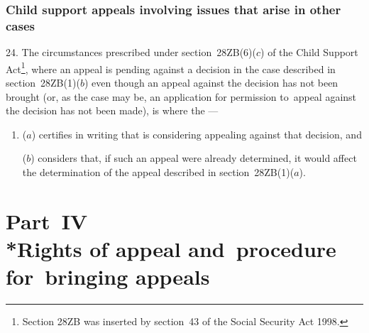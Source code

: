 \documentclass[12pt,a4paper]{article}
\begin{document}
\subsubsection[24. Child support appeals involving issues that arise in other cases]{Child support appeals involving issues that arise in other cases}

24.  The circumstances prescribed under section~28ZB(6)($c$) of the Child Support Act\footnote{\frenchspacing Section 28ZB was inserted by section~43 of the Social Security Act 1998.}, where an appeal is pending against a decision in the case described in section~28ZB(1)($b$) even though an appeal against the decision has not been brought (or, as the case may be, an application for 
permission  %
to~appeal against the decision has not been made), is where the 
%
—
\begin{enumerate}\item[]
($a$) certifies in writing that 
%
is considering appealing against that decision, and

($b$) considers that, if such an appeal were already determined, it would affect the determination of the appeal described in section~28ZB(1)($a$).
\end{enumerate}


\section[Part~IV --- Rights of appeal and~procedure for~bringing appeals]{\sloppy{} Part~IV\\*Rights of appeal and~procedure for~bringing appeals}

\end{document}
